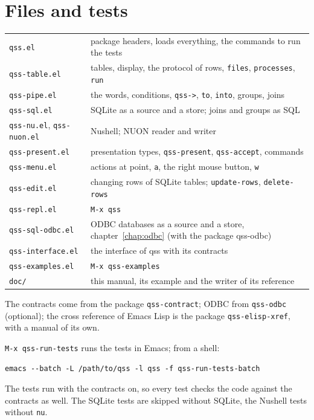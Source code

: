 \documentclass[
  paper=a4, fontsize=11pt, parskip=half, headings=small,
  toc=bibliography, numbers=noenddot, DIV=12
]{scrreprt}
\newcommand{\code}[1]{\texttt{#1}}
\newcommand{\file}[1]{\texttt{#1}}
\newcommand{\kbd}[1]{\texttt{#1}}
\newcommand{\qss}{\textsf{qss}}
\begin{document}
\chapter{Files and tests}

\noindent\begin{tabularx}{\linewidth}{@{}lX@{}}
\toprule
\file{qss.el} & package headers, loads everything, the commands to run the tests \\
\file{qss-table.el} & tables, display, the protocol of rows, \code{files}, \code{processes}, \code{run} \\
\file{qss-pipe.el} & the words, conditions, \code{qss->}, \code{to}, \code{into}, groups, joins \\
\file{qss-sql.el} & SQLite as a source and a store; joins and groups as SQL \\
\file{qss-nu.el}, \file{qss-nuon.el} & Nushell; NUON reader and writer \\
\file{qss-present.el} & presentation types, \code{qss-present}, \code{qss-accept}, commands \\
\file{qss-menu.el} & actions at point, \kbd{a}, the right mouse button, \kbd{w} \\
\file{qss-edit.el} & changing rows of SQLite tables; \code{update-rows}, \code{delete-rows} \\
\file{qss-repl.el} & \kbd{M-x qss} \\
\file{qss-sql-odbc.el} & ODBC databases as a source and a store, chapter~\ref{chap:odbc} (with the package qss-odbc) \\
\file{qss-interface.el} & the interface of \qss{} with its contracts \\
\file{qss-examples.el} & \kbd{M-x qss-examples} \\
\file{doc/} & this manual, its example and the writer of its reference \\
\bottomrule
\end{tabularx}

The contracts come from the package \file{qss-contract}; ODBC from
\file{qss-odbc} (optional); the cross reference of Emacs Lisp is the package
\file{qss-elisp-xref}, with a manual of its own.

\kbd{M-x qss-run-tests} runs the tests in Emacs; from a shell:

\begin{Verbatim}
emacs --batch -L /path/to/qss -l qss -f qss-run-tests-batch
\end{Verbatim}

The tests run with the contracts on, so every test checks the code against the
contracts as well. The SQLite tests are skipped without SQLite, the Nushell
tests without \code{nu}.
\end{document}
